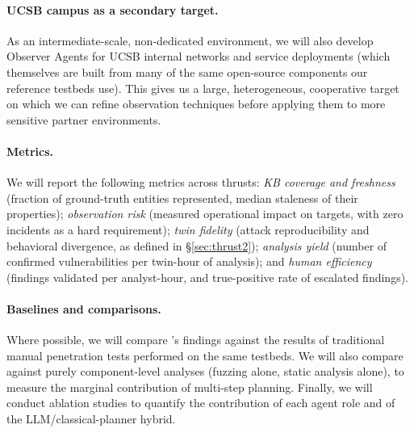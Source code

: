 \paragraph{UCSB campus as a secondary target.}
As an intermediate-scale, non-dedicated environment, we will also
develop Observer Agents for UCSB internal networks and service
deployments (which themselves are built from many of the same
open-source components our reference testbeds use). This gives us a
large, heterogeneous, cooperative target on which we can refine
observation techniques before applying them to more sensitive
partner environments.

\paragraph{Metrics.}
We will report the following metrics across thrusts:
\emph{KB coverage and freshness} (fraction of ground-truth entities
represented, median staleness of their properties);
\emph{observation risk} (measured operational impact on targets, with
zero incidents as a hard requirement);
\emph{twin fidelity} (attack reproducibility and behavioral divergence,
as defined in \S\ref{sec:thrust2});
\emph{analysis yield} (number of confirmed vulnerabilities per
twin-hour of analysis); and
\emph{human efficiency} (findings validated per analyst-hour, and
true-positive rate of escalated findings).

\paragraph{Baselines and comparisons.}
Where possible, we will compare \sysname's findings against the
results of traditional manual penetration tests performed on the same
testbeds. We will also compare against purely component-level
analyses (fuzzing alone, static analysis alone), to measure the
marginal contribution of multi-step planning. Finally, we will
conduct ablation studies to quantify the contribution of each agent
role and of the LLM/classical-planner hybrid.
